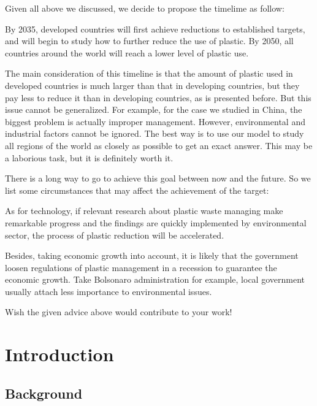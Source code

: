 \documentclass{mcmthesis}
\begin{document}
\begin{memo}[Memorandum]
Given all above we discussed, we decide to propose the timelime as follow:

By 2035, developed countries will first achieve reductions to established targets, and will begin to study how to further reduce the use of plastic. 
By 2050, all countries around the world will reach a lower level of plastic use. 

The main consideration of this timeline is that the amount of plastic used in developed countries is much larger than that in developing countries, but they pay less to reduce it than in developing countries, as is presented before. But this issue cannot be generalized. For example, for the case we studied in China, the biggest problem is actually improper management. However, environmental and industrial factors cannot be ignored. The best way is to use our model to study all regions of the world as closely as possible to get an exact answer. This may be a laborious task, but it is definitely worth it.

There is a long way to go to achieve this goal between now and the future.  So we list some circumstances that may affect the achievement of the target:

As for technology, if relevant research about plastic waste managing make remarkable progress and the findings are quickly implemented by environmental sector, the process of plastic reduction will be accelerated. 

Besides, taking economic growth into account, it is likely that the government loosen regulations of plastic management in a recession to guarantee the economic growth. Take Bolsonaro administration for example, local government usually attach less importance to environmental issues.

Wish the given advice above would contribute to your work!

\thispagestyle{empty}

\end{memo}

\setcounter{page}{1}
\section{Introduction}
\subsection{Background}
\end{document}
